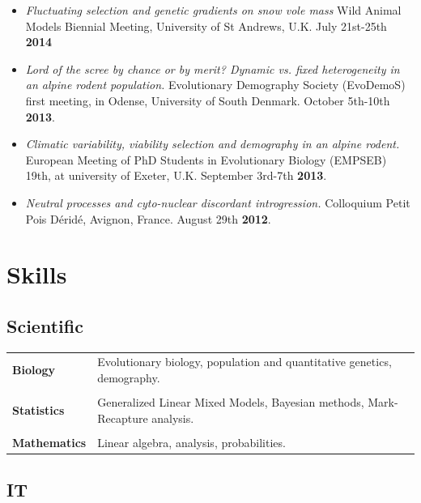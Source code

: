 \documentclass[a4paper,10pt]{article} %
\begin{document}
\begin{itemize}
\item \textit{Fluctuating selection and genetic gradients on snow vole mass} Wild Animal Models Biennial Meeting, University of St Andrews, U.K. July 21st-25th \textbf{2014}
\item \textit{Lord of the scree by chance or by merit? Dynamic vs. fixed heterogeneity in an alpine rodent population.} Evolutionary Demography Society (EvoDemoS) first meeting, in Odense, University of South Denmark. October 5th-10th \textbf{2013}.
\item \textit{Climatic variability, viability selection and demography in an alpine rodent.} European Meeting of PhD Students in Evolutionary Biology (EMPSEB) 19th, at university of Exeter, U.K. September 3rd-7th \textbf{2013}.
\item \textit{Neutral processes and cyto-nuclear discordant introgression.} Colloquium Petit Pois D\'{e}rid\'{e}, Avignon, France. August 29th \textbf{2012}.
\end{itemize}

\section*{Skills}
\subsection*{Scientific}
\begin{tabular}{p{4cm}|p{11cm}}
\hfill \textbf{Biology} & Evolutionary biology, population and quantitative genetics, demography.\\
\multicolumn{2}{c}{} \\
\hfill \textbf{Statistics} & Generalized Linear Mixed Models, Bayesian methods, Mark-Recapture analysis.\\
\multicolumn{2}{c}{} \\
\hfill \textbf{Mathematics} & Linear algebra, analysis, probabilities.\\
\end{tabular}

\subsection*{IT}
\end{document}
